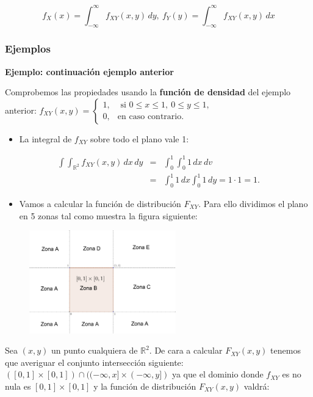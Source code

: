 \documentclass[]{book}
\providecommand{\tightlist}{%
  \setlength{\itemsep}{0pt}\setlength{\parskip}{0pt}}
\begin{document}
\[
f_X(x)=\int_{-\infty}^\infty f_{XY}(x,y)\, dy,\ f_Y(y)=\int_{-\infty}^\infty f_{XY}(x,y)\, dx
\]

\hypertarget{ejemplos-1}{%
\subsubsection{Ejemplos}\label{ejemplos-1}}

\textbf{Ejemplo: continuación ejemplo anterior}

Comprobemos las propiedades usando la \textbf{función de densidad} del ejemplo anterior:
\(f_{XY}(x,y)=\begin{cases} 1, & \mbox{ si }0\leq x\leq 1,\ 0\leq y\leq 1, \\ 0, & \mbox{en caso contrario.} \end{cases}\)

\begin{itemize}
\tightlist
\item
  La integral de \(f_{XY}\) sobre todo el plano vale 1:
\end{itemize}

\[
\begin{array}{rcl}
\int\int_{\mathbb{R}^2} f_{XY}(x,y)\,dx\, dy &=&\int_0^1\int_0^1 1\, dx\, dv\\
&=&\int_0^1 1\, dx\int_0^1 1\, dy=1\cdot 1=1.
\end{array}
\]

\begin{itemize}
\tightlist
\item
  Vamos a calcular la función de distribución \(F_{XY}\). Para ello dividimos el plano en 5 zonas tal como muestra la figura siguiente:
\end{itemize}

\begin{figure}
\includegraphics[width=2.5in]{Images/VaUniformeBidi2} \end{figure}

Sea \((x,y)\) un punto cualquiera de \(\mathbb{R}^2\). De cara a calcular \(F_{XY}(x,y)\) tenemos que averiguar el conjunto intersección siguiente: \(([0,1]\times [0,1])\cap ((-\infty,x]\times (-\infty,y])\) ya que el dominio donde \(f_{XY}\) es no nula es \([0,1]\times [0,1]\) y la función de distribución \(F_{XY}(x,y)\) valdrá:
\end{document}
